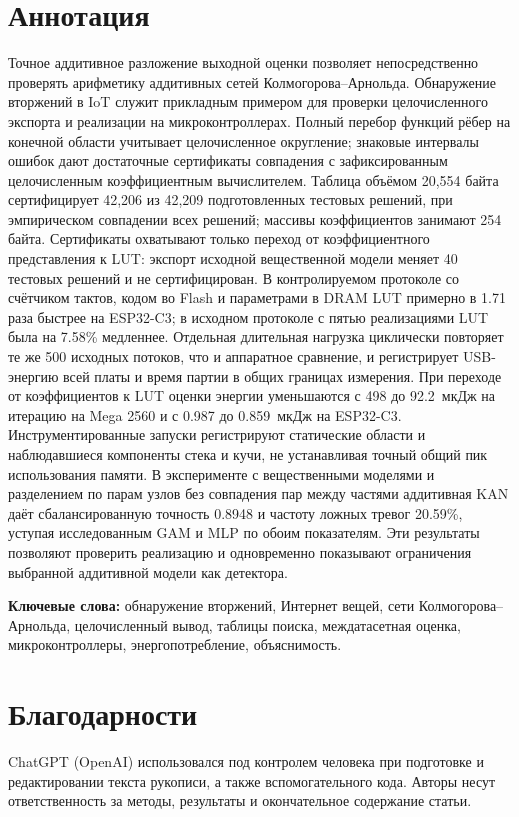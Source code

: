 \documentclass[a4paper,11pt]{article}
\begin{document}
\section*{Аннотация}
Точное аддитивное разложение выходной оценки позволяет непосредственно проверять арифметику аддитивных сетей Колмогорова--Арнольда. Обнаружение вторжений в IoT служит прикладным примером для проверки целочисленного экспорта и реализации на микроконтроллерах. Полный перебор функций рёбер на конечной области учитывает целочисленное округление; знаковые интервалы ошибок дают достаточные сертификаты совпадения с зафиксированным целочисленным коэффициентным вычислителем. Таблица объёмом 20,554 байта сертифицирует 42,206 из 42,209 подготовленных тестовых решений, при эмпирическом совпадении всех решений; массивы коэффициентов занимают 254 байта. Сертификаты охватывают только переход от коэффициентного представления к LUT: экспорт исходной вещественной модели меняет 40 тестовых решений и не сертифицирован. В контролируемом протоколе со счётчиком тактов, кодом во Flash и параметрами в DRAM LUT примерно в 1.71 раза быстрее на ESP32-C3; в исходном протоколе с пятью реализациями LUT была на 7.58\% медленнее. Отдельная длительная нагрузка циклически повторяет те же 500 исходных потоков, что и аппаратное сравнение, и регистрирует USB-энергию всей платы и время партии в общих границах измерения. При переходе от коэффициентов к LUT оценки энергии уменьшаются с 498 до 92.2~мкДж на итерацию на Mega 2560 и с 0.987 до 0.859~мкДж на ESP32-C3. Инструментированные запуски регистрируют статические области и наблюдавшиеся компоненты стека и кучи, не устанавливая точный общий пик использования памяти. В эксперименте с вещественными моделями и разделением по парам узлов без совпадения пар между частями аддитивная KAN даёт сбалансированную точность 0.8948 и частоту ложных тревог 20.59\%, уступая исследованным GAM и MLP по обоим показателям. Эти результаты позволяют проверить реализацию и одновременно показывают ограничения выбранной аддитивной модели как детектора.

\noindent\textbf{Ключевые слова:} обнаружение вторжений, Интернет вещей, сети Колмогорова--Арнольда, целочисленный вывод, таблицы поиска, междатасетная оценка, микроконтроллеры, энергопотребление, объяснимость.




\section*{Благодарности}
ChatGPT (OpenAI) использовался под контролем человека при подготовке и редактировании текста рукописи, а также вспомогательного кода. Авторы несут ответственность за методы, результаты и окончательное содержание статьи.
\par\medskip
\begingroup
\fontsize{8}{9}\selectfont
\setlength{\parskip}{0pt}
\newcommand{\BIBdecl}{\setlength{\itemsep}{1.5pt}\setlength{\parsep}{0pt}}


\endgroup
\par\medskip
\clearpage
\end{document}
